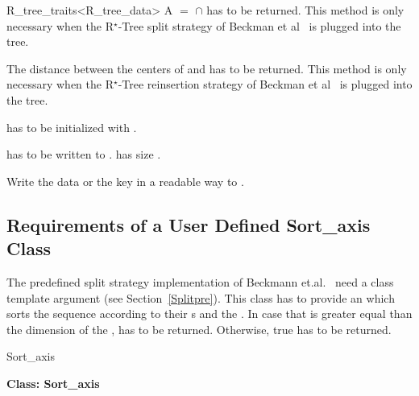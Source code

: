 \begin{ccClassTemplate}{R_tree_traits<R_tree_data>}
{A $=$  $\cap$  has to be returned.
 This method is only
  necessary when the R$^\star$-Tree split strategy of Beckman et
  al~\cite{Beckmann:1990:RER} is plugged into the tree.}

{The distance between the centers of  and  has to
  be returned.
This method is only
  necessary when the R$^\star$-Tree reinsertion strategy of Beckman et
  al~\cite{Beckmann:1990:RER} is plugged into the tree.}

{ has to be initialized with .}

{ has to be  written to .  has size .}

{Write the data or the key in a readable way to .}

\end{ccClassTemplate}
\subsection{Requirements of a User Defined Sort\_axis Class}
\label{Sortuser}
The predefined split strategy implementation of
Beckmann et.al.~\cite{Beckmann:1990:RER} need a 
 class template argument (see Section~\ref{Splitpre}). This class has to
provide  an  which sorts the
sequence \ccc{[first,last[} according to their s and the
. In
case that  is greater equal than the dimension of
the ,  has to be  returned. Otherwise, true
has to be returned.


\begin{ccClass}{Sort_axis}

\noindent
{\bf Class: Sort\_axis}


\ccOperations
{}
\end{ccClass}

